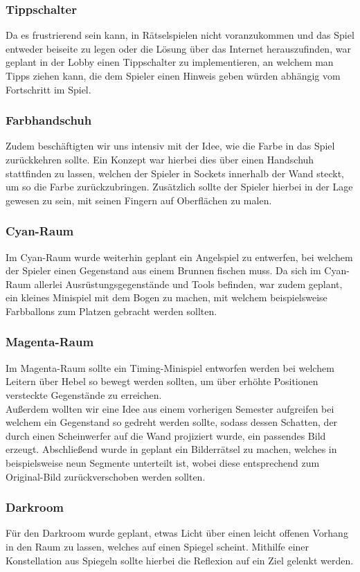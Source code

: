 \subsubsection{Tippschalter}
Da es frustrierend sein kann, in Rätselspielen nicht voranzukommen und das Spiel entweder beiseite zu legen oder die Lösung über das Internet herauszufinden, war geplant in der Lobby einen Tippschalter zu implementieren, an welchem man Tipps ziehen kann, die dem Spieler einen Hinweis geben würden abhängig vom Fortschritt im Spiel.
\subsubsection{Farbhandschuh}
Zudem beschäftigten wir uns intensiv mit der Idee, wie die Farbe in das Spiel zurückkehren sollte. Ein Konzept war hierbei dies über einen Handschuh stattfinden zu lassen, welchen der Spieler in Sockets innerhalb der Wand steckt, um so die Farbe zurückzubringen. Zusätzlich sollte der Spieler hierbei in der Lage gewesen zu sein, mit seinen Fingern auf Oberflächen zu malen.
\subsubsection{Cyan-Raum}
Im Cyan-Raum wurde weiterhin geplant ein Angelspiel zu entwerfen, bei welchem der Spieler einen Gegenstand aus einem Brunnen fischen muss. 
Da sich im Cyan-Raum allerlei Ausrüstungsgegenstände und Tools befinden, war zudem geplant, ein kleines Minispiel mit dem Bogen zu machen, mit welchem beispielsweise Farbballons zum Platzen gebracht werden sollten.
\subsubsection{Magenta-Raum}
Im Magenta-Raum sollte ein Timing-Minispiel entworfen werden bei welchem Leitern über Hebel so bewegt werden sollten, um über erhöhte Positionen versteckte Gegenstände zu erreichen.\\
Außerdem wollten wir eine Idee aus einem vorherigen Semester aufgreifen bei welchem ein Gegenstand so gedreht werden sollte, sodass dessen Schatten, der durch einen Scheinwerfer auf die Wand projiziert wurde, ein passendes Bild erzeugt. Abschließend wurde in geplant ein Bilderrätsel zu machen, welches in beispielsweise neun Segmente unterteilt ist, wobei diese entsprechend zum Original-Bild zurückverschoben werden sollten. 
\subsubsection{Darkroom}
Für den Darkroom wurde geplant, etwas Licht über einen leicht offenen Vorhang in den Raum zu lassen, welches auf einen Spiegel scheint. Mithilfe einer Konstellation aus Spiegeln sollte hierbei die Reflexion auf ein Ziel gelenkt werden.


